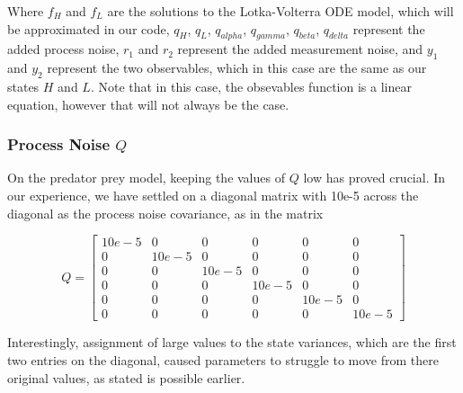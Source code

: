 \documentclass{article}
\begin{document}
Where $f_H$ and $f_L$ are the solutions to the Lotka-Volterra ODE model, which will be approximated in our code, $q_H$, $q_L$, $q_{alpha}$, $q_{gamma}$, $q_{beta}$, $q_{delta}$ represent the added process noise, $r_1$ and $r_2$ represent the added measurement noise, and $y_1$ and $y_2$ represent the two observables, which in this case are the same as our states $H$ and $L$. Note that in this case, the obsevables function is a linear equation, however that will not always be the case. 

\subsubsection{Process Noise $Q$}
On the predator prey model, keeping the values of $Q$ low has proved crucial. In our experience, we have settled on a diagonal matrix with 10e-5 across the diagonal as the process noise covariance, as in the matrix

\begin{equation}
Q = \begin{bmatrix}
10e-5 & 0 & 0 & 0 & 0 & 0\\
0 & 10e-5 & 0 & 0 & 0 & 0\\
0 & 0 & 10e-5 & 0 & 0 & 0\\
0 & 0 & 0 & 10e-5 & 0 & 0\\
0 & 0 & 0 & 0  & 10e-5 & 0\\
0 & 0 & 0 & 0 & 0 & 10e-5\end{bmatrix}
\end{equation}

Interestingly, assignment of large values to the state variances, which are the first two entries on the diagonal, caused parameters to struggle to move from there original values, as stated is possible earlier. 
\end{document}
